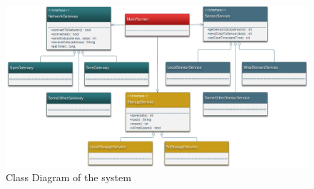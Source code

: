 \documentclass[12pt, svn, draft]{rureport}
\begin{document}
\begin{figure}[H]
\centering
\includegraphics[width=1\linewidth]{graphics/ClassDiagram}
\caption{Class Diagram of the system\label{fig:ClassDiagram}}
\end{figure}
\end{document}
